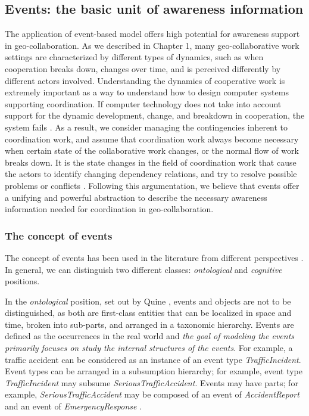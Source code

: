 \subsection{Events: the basic unit of awareness information} %
\label{sub:understanding_events}
The application of event-based model offers high potential for awareness support in geo-collaboration. As we described in Chapter 1, many geo-collaborative work settings are characterized by different types of dynamics, such as when cooperation breaks down, changes over time, and is perceived differently by different actors involved. Understanding the dynamics of cooperative work is extremely important as a way to understand how to design computer systems supporting coordination. If computer technology does not take into account support for the dynamic development, change, and breakdown in cooperation, the system fails \cite{bardram1998designing}. As a result, we consider managing the contingencies inherent to coordination work, and assume that coordination work always become necessary when certain state of the collaborative work changes, or the normal flow of work breaks down. It is the state changes in the field of coordination work that cause the actors to identify changing dependency relations, and try to resolve possible problems or conflicts \cite{symon1996coordination}. Following this argumentation, we believe that events offer a unifying and powerful abstraction to describe the necessary awareness information needed for coordination in geo-collaboration. 

\subsubsection{The concept of events} %
\label{ssub:the_concept_of_events}
The concept of events has been used in the literature from different perspectives \cite{worboys2005a}. In general, we can distinguish two different classes: \emph{ontological} and \emph{cognitive} positions. 

In the \emph{ontological} position, set out by Quine \cite{quine1985events}, events and objects are not to be distinguished, as both are first-class entities that can be localized in space and time, broken into sub-parts, and arranged in a taxonomic hierarchy. Events are defined as the occurrences in the real world and \emph{the goal of modeling the events primarily focuses on study the internal structures of the events}. For example, a traffic accident can be considered as an instance of an event type \emph{TrafficIncident}. Event types can be arranged in a subsumption hierarchy; for example, event type \emph{TrafficIncident} may subsume \emph{SeriousTrafficAccident}. Events may have parts; for example, \emph{SeriousTrafficAccident} may be composed of an event of \emph{AccidentReport} and an event of \emph{EmergencyResponse} \cite{worboys2005a}.  


